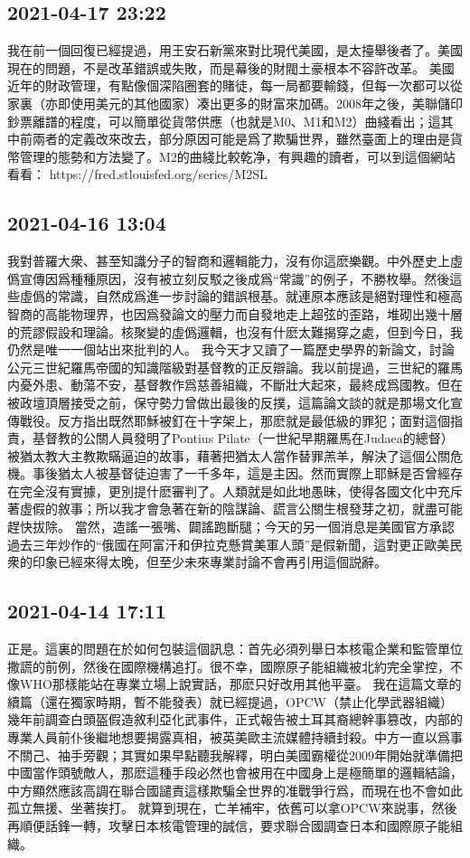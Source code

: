 \documentclass[twocolumn]{ctexart}
\begin{document}
\subsection*{2021-04-17 23:22}

我在前一個回復已經提過，用王安石新黨來對比現代美國，是太擡舉後者了。美國現在的問題，不是改革錯誤或失敗，而是幕後的財閥土豪根本不容許改革。
美國近年的財政管理，有點像個深陷圈套的賭徒，每一局都要輸錢，但每一次都可以從家裏（亦即使用美元的其他國家）凑出更多的財富來加碼。2008年之後，美聯儲印鈔票離譜的程度，可以簡單從貨幣供應（也就是M0、M1和M2）曲綫看出；這其中前兩者的定義改來改去，部分原因可能是爲了欺騙世界，雖然臺面上的理由是貨幣管理的態勢和方法變了。M2的曲綫比較乾净，有興趣的讀者，可以到這個網站看看：
https://fred.stlouisfed.org/series/M2SL
\subsection*{2021-04-16 13:04}

我對普羅大衆、甚至知識分子的智商和邏輯能力，沒有你這麽樂觀。中外歷史上虛僞宣傳因爲種種原因，沒有被立刻反駁之後成爲“常識”的例子，不勝枚舉。然後這些虛僞的常識，自然成爲進一步討論的錯誤根基。就連原本應該是絕對理性和極高智商的高能物理界，也因爲發論文的壓力而自發地走上超弦的歪路，堆砌出幾十層的荒謬假設和理論。核聚變的虛僞邏輯，也沒有什麽太難揭穿之處，但到今日，我仍然是唯一一個站出來批判的人。
我今天才又讀了一篇歷史學界的新論文，討論公元三世紀羅馬帝國的知識階級對基督教的正反辯論。我以前提過，三世紀的羅馬内憂外患、動蕩不安，基督教作爲慈善組織，不斷壯大起來，最終成爲國教。但在被政壇頂層接受之前，保守勢力曾做出最後的反撲，這篇論文談的就是那場文化宣傳戰役。反方指出既然耶穌被釘在十字架上，那麽就是最低級的罪犯；面對這個指責，基督教的公關人員發明了Pontius Pilate（一世紀早期羅馬在Judaea的總督）被猶太教大主教欺瞞逼迫的故事，藉著把猶太人當作替罪羔羊，解決了這個公關危機。事後猶太人被基督徒迫害了一千多年，這是主因。然而實際上耶穌是否曾經存在完全沒有實據，更別提什麽審判了。人類就是如此地愚昧，使得各國文化中充斥著虛假的敘事；所以我才會急著在新的陰謀論、謊言公關生根發芽之初，就盡可能趕快拔除。
當然，造謠一張嘴、闢謠跑斷腿；今天的另一個消息是美國官方承認過去三年炒作的“俄國在阿富汗和伊拉克懸賞美軍人頭”是假新聞，這對更正歐美民衆的印象已經來得太晚，但至少未來專業討論不會再引用這個説辭。
\subsection*{2021-04-14 17:11}

正是。這裏的問題在於如何包裝這個訊息：首先必須列舉日本核電企業和監管單位撒謊的前例，然後在國際機構追打。很不幸，國際原子能組織被北約完全掌控，不像WHO那樣能站在專業立場上說實話，那麽只好改用其他平臺。
我在這篇文章的續篇（還在獨家時期，暫不能發表）就已經提過，OPCW（禁止化學武器組織）幾年前調查白頭盔假造敘利亞化武事件，正式報告被土耳其裔總幹事篡改，内部的專業人員前仆後繼地想要揭露真相，被英美歐主流媒體持續封殺。中方一直以爲事不關己、袖手旁觀；其實如果早點聽我解釋，明白美國霸權從2009年開始就準備把中國當作頭號敵人，那麽這種手段必然也會被用在中國身上是極簡單的邏輯結論，中方顯然應該高調在聯合國譴責這樣欺騙全世界的准戰爭行爲，而現在也不會如此孤立無援、坐著挨打。
就算到現在，亡羊補牢，依舊可以拿OPCW來説事，然後再順便話鋒一轉，攻擊日本核電管理的誠信，要求聯合國調查日本和國際原子能組織。
\end{document}

